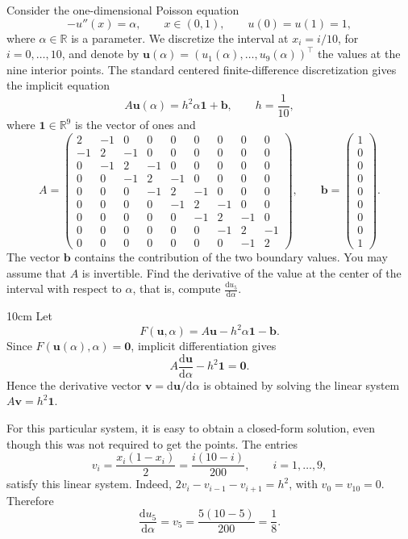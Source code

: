 
Consider the one-dimensional Poisson equation
\[
    -u''(x) = \alpha, \qquad x \in (0,1),
    \qquad u(0)=u(1)=1,
\]
where $\alpha \in \mathbb{R}$ is a parameter. We discretize the interval at
$x_i=i/10$, for $i=0,\ldots,10$, and denote by
$\boldsymbol{u}(\alpha)=(u_1(\alpha),\ldots,u_9(\alpha))^\top$
the values at the nine interior points. The standard centered finite-difference
discretization gives the implicit equation
\[
    A\boldsymbol{u}(\alpha)=h^2\alpha\boldsymbol{1}+\boldsymbol{b},
    \qquad h=\frac{1}{10},
\]
where $\boldsymbol{1}\in\mathbb{R}^9$ is the vector of ones and
\[
 A=\begin{pmatrix}
  2&-1& 0& 0& 0& 0& 0& 0& 0\\
 -1& 2&-1& 0& 0& 0& 0& 0& 0\\
  0&-1& 2&-1& 0& 0& 0& 0& 0\\
  0& 0&-1& 2&-1& 0& 0& 0& 0\\
  0& 0& 0&-1& 2&-1& 0& 0& 0\\
  0& 0& 0& 0&-1& 2&-1& 0& 0\\
  0& 0& 0& 0& 0&-1& 2&-1& 0\\
  0& 0& 0& 0& 0& 0&-1& 2&-1\\
  0& 0& 0& 0& 0& 0& 0&-1& 2
 \end{pmatrix},
 \qquad
 \boldsymbol{b}=\begin{pmatrix}1\\0\\0\\0\\0\\0\\0\\0\\1\end{pmatrix}.
\]
The vector $\boldsymbol{b}$ contains the contribution of the two boundary
values. You may assume that $A$ is invertible.
Find the derivative of the value at the center of the interval with respect
to $\alpha$, that is, compute \( \frac{\mathrm{d}u_5}{\mathrm{d}\alpha}. \)

\begin{solutionbox}{10cm}
    Let
    \[
        F(\boldsymbol{u},\alpha)
        =A\boldsymbol{u}-h^2\alpha\boldsymbol{1}-\boldsymbol{b}.
    \]
    Since $F(\boldsymbol{u}(\alpha),\alpha)=\boldsymbol{0}$, implicit
    differentiation gives
    \[
        A\frac{\mathrm{d}\boldsymbol{u}}{\mathrm{d}\alpha}
        -h^2\boldsymbol{1}=\boldsymbol{0}.
    \]
    Hence the derivative vector $\boldsymbol{v}
    =\mathrm{d}\boldsymbol{u}/\mathrm{d}\alpha$ is obtained by solving the
    linear system $A\boldsymbol{v}=h^2\boldsymbol{1}$.

    For this particular system, it is easy to obtain a closed-form solution,
    even though this was not required to get the points. The entries
    \[
        v_i=\frac{x_i(1-x_i)}{2}
        =\frac{i(10-i)}{200}, \qquad i=1,\ldots,9,
    \]
    satisfy this linear system. Indeed,
    $2v_i-v_{i-1}-v_{i+1}=h^2$, with $v_0=v_{10}=0$.
    Therefore
    \[
        \boxed{\frac{\mathrm{d}u_5}{\mathrm{d}\alpha}
        =v_5=\frac{5(10-5)}{200}=\frac18.}
    \]
\end{solutionbox}
